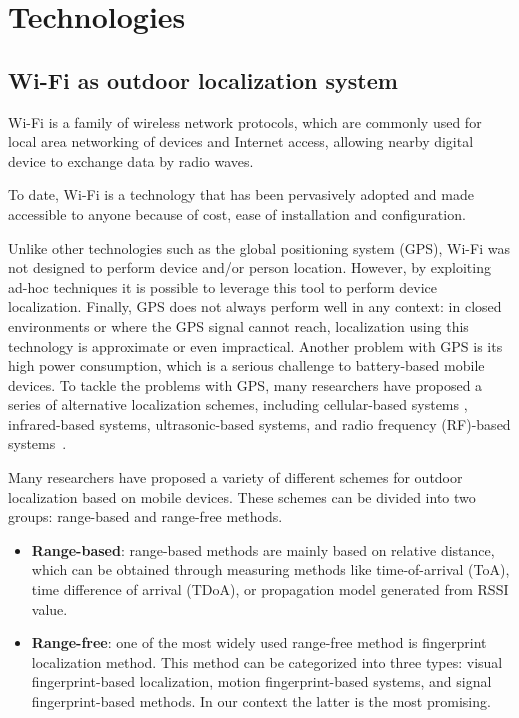 \section{Technologies}

\subsection{Wi-Fi as outdoor localization system}

Wi-Fi is a family of wireless network protocols, which are commonly used for local area networking of devices and Internet access, allowing nearby digital device to exchange data by radio waves.

To date, Wi-Fi is a technology that has been pervasively adopted and made accessible to anyone because of cost, ease of installation and configuration.

Unlike other technologies such as the global positioning system (GPS), Wi-Fi was not designed to perform device and/or person location. However, by exploiting ad-hoc techniques it is possible
to leverage this tool to perform device localization. Finally, GPS does not always perform well in any context: in closed environments or where the GPS signal cannot reach, localization using
this technology is approximate or even impractical.
Another problem with GPS is its high power consumption, which is a serious challenge to battery-based mobile devices.
To tackle the problems with GPS, many researchers have proposed a series of alternative localization schemes, including cellular-based systems \cite{ibrahim2010cellsense},
infrared-based systems, ultrasonic-based systems, and radio frequency (RF)-based systems~\cite{bahl2000radar, youssef2002probabilistic}.

Many researchers have proposed a variety of different schemes for outdoor localization based on mobile
devices. These schemes can be divided into two groups: range-based and range-free methods.

\begin{itemize}
      \item \textbf{Range-based}: range-based methods are mainly based on relative distance, which can be obtained through measuring methods like time-of-arrival (ToA),
            time difference of arrival (TDoA), or propagation model generated from RSSI value.
      \item \textbf{Range-free}: one of the most widely used range-free method is fingerprint localization method. This method can be categorized into three types:
            visual fingerprint-based localization, motion fingerprint-based systems, and signal fingerprint-based methods. In our context the latter is the most promising.
\end{itemize}

